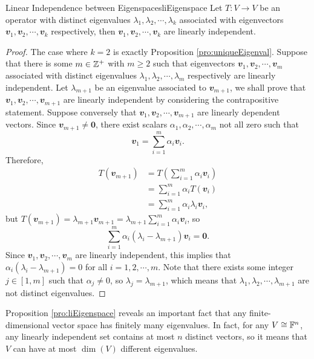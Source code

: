 \documentclass[math, code]{amznotes}
\theoremstyle{remark}
\newcommand{\zero}{\mathbf{0}}
\begin{document}
\begin{probox}{Linear Independence between Eigenspaces}{liEigenspace}
    Let $T \colon V \to V$ be an operator with distinct eigenvalues $\lambda_1, \lambda_2, \cdots, \lambda_k$ associated with eigenvectors $\mathbfit{v}_1, \mathbfit{v}_2, \cdots, \mathbfit{v}_k$ respectively, then $\mathbfit{v}_1, \mathbfit{v}_2, \cdots, \mathbfit{v}_k$ are linearly independent.
    \tcblower
    \begin{proof}
        The case where $k = 2$ is exactly Proposition \ref{pro:uniqueEigenval}. Suppose that there is some $m \in \mathbb{Z}^+$ with $m \geq 2$ such that eigenvectors $\mathbfit{v}_1, \mathbfit{v}_2, \cdots, \mathbfit{v}_m$ associated with distinct eigenvalues $\lambda_1, \lambda_2, \cdots, \lambda_m$ respectively are linearly independent. Let $\lambda_{m + 1}$ be an eigenvalue associated to $\mathbfit{v}_{m + 1}$, we shall prove that $\mathbfit{v}_1, \mathbfit{v}_2, \cdots, \mathbfit{v}_{m + 1}$ are linearly independent by considering the contrapositive statement. Suppose conversely that $\mathbfit{v}_1, \mathbfit{v}_2, \cdots, \mathbfit{v}_{m + 1}$ are linearly dependent vectors. Since $\mathbfit{v}_{m + 1} \neq \zero$, there exist scalars $\alpha_1, \alpha_2, \cdots, \alpha_m$ not all zero such that 
        \begin{equation*}
            \mathbfit{v}_1 = \sum_{i = 1}^{m}\alpha_i\mathbfit{v}_i.
        \end{equation*}
        Therefore, 
        \begin{align*}
            T(\mathbfit{v}_{m + 1}) & = T\left(\sum_{i = 1}^{m}\alpha_i\mathbfit{v}_i\right) \\
            & = \sum_{i = 1}^{m}\alpha_iT(\mathbfit{v}_i) \\
            & = \sum_{i = 1}^{m}\alpha_i\lambda_i\mathbfit{v}_i,
        \end{align*}
        but $T(\mathbfit{v}_{m + 1}) = \lambda_{m + 1}\mathbfit{v}_{m + 1} = \lambda_{m + 1}\sum_{i = 1}^{m}\alpha_i\mathbfit{v}_i$, so
        \begin{equation*}
            \sum_{i = 1}^m\alpha_i(\lambda_i - \lambda_{m + 1})\mathbfit{v}_i = \zero.
        \end{equation*}
        Since $\mathbfit{v}_1, \mathbfit{v}_2, \cdots, \mathbfit{v}_{m}$ are linearly independent, this implies that $\alpha_i(\lambda_i - \lambda_{m + 1}) = 0$ for all $i = 1, 2, \cdots, m$. Note that there exists some integer $j \in [1, m]$ such that $\alpha_j \neq 0$, so $\lambda_j = \lambda_{m + 1}$, which means that $\lambda_1, \lambda_2, \cdots, \lambda_{m + 1}$ are not distinct eigenvalues.
    \end{proof}
\end{probox}
Proposition \ref{pro:liEigenspace} reveals an important fact that any finite-dimensional vector space has finitely many eigenvalues. In fact, for any $V \cong \mathbb{F}^n$, any linearly independent set contains at most $n$ distinct vectors, so it means that $V$ can have at most $\dim(V)$ different eigenvalues.
\end{document}
